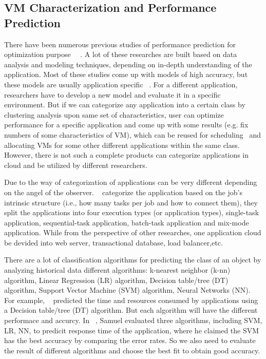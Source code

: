 \subsection{VM Characterization and Performance Prediction}


There have been numerous previous studies of performance prediction for optimization purpose~\cite{Yang2005} ~\cite{Matsunaga2010}. A lot of these researches are built based on data analysis and modeling techniques, depending on in-depth understanding of the application. Most of these studies come up with models of high accuracy, but these models are usually application specific ~\cite{Shan2008}. For a different application, researchers have to develop a new model and evaluate it in a specific environment. But if we can categorize any application into a certain class by clustering analysis upon same set of characteristics, user can optimize performance for a specific application and come up with some results (e.g. fix numbers of some characteristics of VM), which can be reused for scheduling ~\cite{OguraM10}and allocating VMs for some other different applications within the same class. However, there is not such a complete products can categorize applications in cloud and be utilized by different researchers.

Due to the way of categorization of applications can be very different depending on the angel of the observer. ~\cite{Derrick2014} categorize the application based on the job’s intrinsic structure (i.e., how many tasks per job and how to connect them), they split the applications into four execution types (or application types), single-task application, sequential-task application, batch-task application and mix-mode application. While from the perspective of other researches, one application cloud be devided into web server, transactional database, load balancer,etc.

There are a lot of classification algorithms for predicting the class of an object by analyzing historical data different algorithms: k-nearest neighbor (k-nn) algorithm, Linear Regression (LR) algorithm, Decision table/tree (DT) algorithm, Support Vector Machine (SVM) algorithm, Neural Networks (NN). For example, ~\cite{Matsunaga2010} predicted the time and resources consumed by applications using a Decision table/tree (DT) algorithm. But each algorithm will have the different performace and accurcy. In ~\cite{Samuel2013}, Samuel evaluated three algorithms, including SVM, LR, NN, to predicit response time of the application, where he claimed the SVM has the best accuracy by comparing the error rates. So we also need to evaluate the result of different algorithms and choose the best fit to obtain good accuracy.